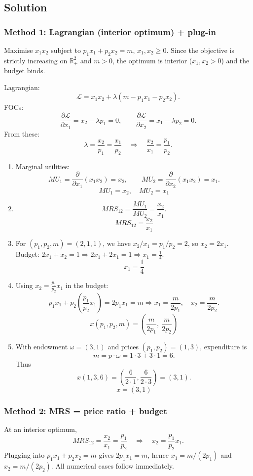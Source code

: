 \documentclass[12pt]{article}
\newcommand{\Rp}{\mathbb{R}_+}
\newcommand{\dotp}{\cdot}
\begin{document}
\subsection*{Solution}

\subsubsection*{Method 1: Lagrangian (interior optimum) + plug-in}
Maximise \(x_1x_2\) subject to \(p_1x_1+p_2x_2=m\), \(x_1,x_2\ge 0\). Since the objective is strictly increasing on \(\Rp^2\) and \(m>0\), the optimum is interior (\(x_1,x_2>0\)) and the budget binds.

Lagrangian:
\[
\mathcal{L}=x_1x_2+\lambda(m-p_1x_1-p_2x_2).
\]
FOCs:
\[
\frac{\partial\mathcal{L}}{\partial x_1}=x_2-\lambda p_1=0,\qquad
\frac{\partial\mathcal{L}}{\partial x_2}=x_1-\lambda p_2=0.
\]
From these:
\[
\lambda=\frac{x_2}{p_1}=\frac{x_1}{p_2}\quad\Rightarrow\quad \frac{x_2}{x_1}=\frac{p_1}{p_2}.
\]

\begin{enumerate}[label=\arabic*., leftmargin=*]
\item Marginal utilities:
\[
MU_1=\frac{\partial}{\partial x_1}(x_1x_2)=x_2,\qquad
MU_2=\frac{\partial}{\partial x_2}(x_1x_2)=x_1.
\]
\[
\boxed{\,MU_1=x_2,\quad MU_2=x_1\,}
\]

\item
\[
MRS_{12}=\frac{MU_1}{MU_2}=\frac{x_2}{x_1}.
\]
\[
\boxed{\,MRS_{12}=\dfrac{x_2}{x_1}\,}
\]

\item For \((p_1,p_2,m)=(2,1,1)\), we have \(x_2/x_1=p_1/p_2=2\), so \(x_2=2x_1\).
Budget: \(2x_1+x_2=1\Rightarrow 2x_1+2x_1=1\Rightarrow x_1=\tfrac14\).
\[
\boxed{\,x_1=\dfrac14\,}
\]

\item Using \(x_2=\frac{p_1}{p_2}x_1\) in the budget:
\[
p_1x_1+p_2\left(\frac{p_1}{p_2}x_1\right)=2p_1x_1=m
\Rightarrow x_1=\frac{m}{2p_1},\quad x_2=\frac{m}{2p_2}.
\]
\[
\boxed{\,x(p_1,p_2,m)=\left(\dfrac{m}{2p_1},\ \dfrac{m}{2p_2}\right)\,}
\]

\item With endowment \(\omega=(3,1)\) and prices \((p_1,p_2)=(1,3)\), expenditure is
\[
m=p\dotp\omega=1\cdot 3+3\cdot 1=6.
\]
Thus
\[
x(1,3,6)=\left(\frac{6}{2\cdot 1},\frac{6}{2\cdot 3}\right)=(3,1).
\]
\[
\boxed{\,x=(3,1)\,}
\]
\end{enumerate}

\subsubsection*{Method 2: MRS = price ratio + budget}
At an interior optimum,
\[
MRS_{12}=\frac{x_2}{x_1}=\frac{p_1}{p_2}
\quad\Rightarrow\quad
x_2=\frac{p_1}{p_2}x_1.
\]
Plugging into \(p_1x_1+p_2x_2=m\) gives \(2p_1x_1=m\), hence \(x_1=m/(2p_1)\) and \(x_2=m/(2p_2)\).
All numerical cases follow immediately.
\end{document}
